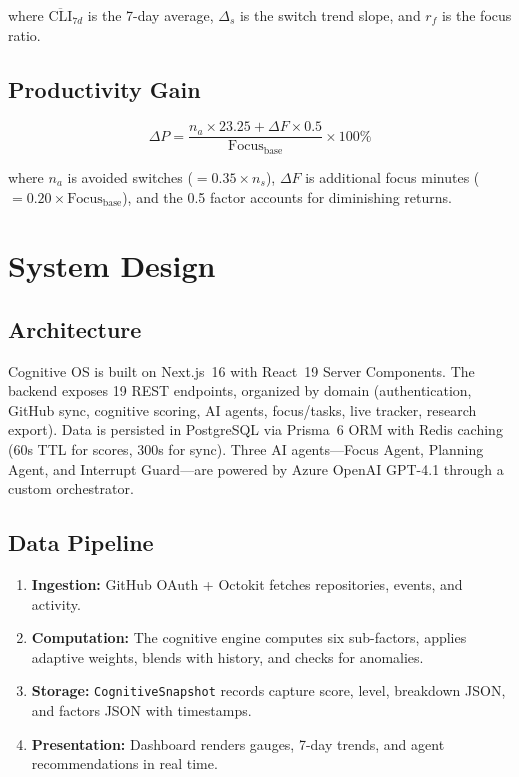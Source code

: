 \documentclass[conference]{IEEEtran}
\begin{document}
where $\overline{\text{CLI}}_{7d}$ is the 7-day average, $\Delta_s$ is the switch trend slope, and $r_f$ is the focus ratio.

\subsection{Productivity Gain}

\begin{equation}
\Delta P = \frac{n_a \times 23.25 + \Delta F \times 0.5}{\text{Focus}_{\text{base}}} \times 100\%
\label{eq:prod}
\end{equation}

where $n_a$ is avoided switches ($= 0.35 \times n_s$), $\Delta F$ is additional focus minutes ($= 0.20 \times \text{Focus}_{\text{base}}$), and the 0.5 factor accounts for diminishing returns.

\section{System Design}

\subsection{Architecture}

Cognitive OS is built on Next.js~16 with React~19 Server Components. The backend exposes 19 REST endpoints, organized by domain (authentication, GitHub sync, cognitive scoring, AI agents, focus/tasks, live tracker, research export). Data is persisted in PostgreSQL via Prisma~6 ORM with Redis caching (60s TTL for scores, 300s for sync). Three AI agents---Focus Agent, Planning Agent, and Interrupt Guard---are powered by Azure OpenAI GPT-4.1 through a custom orchestrator.

\subsection{Data Pipeline}

\begin{enumerate}
    \item \textbf{Ingestion:} GitHub OAuth + Octokit fetches repositories, events, and activity.
    \item \textbf{Computation:} The cognitive engine computes six sub-factors, applies adaptive weights, blends with history, and checks for anomalies.
    \item \textbf{Storage:} \texttt{CognitiveSnapshot} records capture score, level, breakdown JSON, and factors JSON with timestamps.
    \item \textbf{Presentation:} Dashboard renders gauges, 7-day trends, and agent recommendations in real time.
\end{enumerate}
\end{document}
